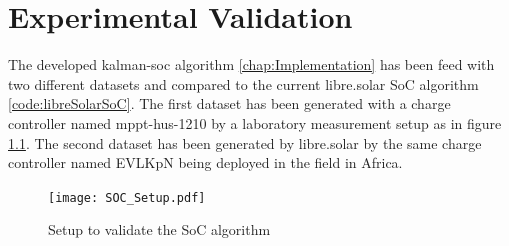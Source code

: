 %
%
%






\chapter{Experimental Validation}

The developed kalman-soc algorithm \ref{chap:Implementation} has been feed with two different datasets and compared to the current libre.solar SoC algorithm \ref{code:libreSolarSoC}. The first dataset  has been generated with a charge controller named mppt-hus-1210 by a laboratory measurement setup as in figure \ref{fig:SoCSetup}. The second dataset has been generated by libre.solar by the same charge controller named EVLKpN being deployed in the field in Africa.


\begin{figure}[h!]
\centering
\texttt{[image: SOC\_Setup.pdf]}
\caption{\label{fig:SoCSetup} Setup to validate the SoC algorithm}
\end{figure}

